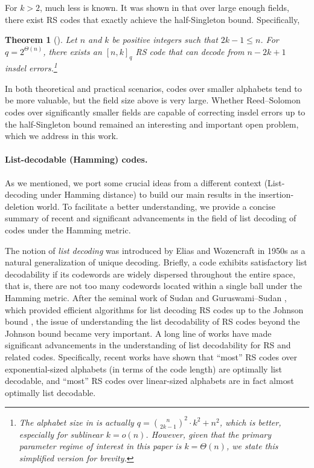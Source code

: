 \documentclass[11pt]{article}
\theoremstyle{plain}
\newtheorem{thm}{Theorem}
\theoremstyle{definition}
\theoremstyle{remark}
\begin{document}
For $k>2$, much less is known. It was shown in \cite{con2023reed} that over large enough fields, there exist RS codes that exactly achieve the half-Singleton bound. 
Specifically, 
\begin{thm}[{\cite[Theorem 16]{con2023reed}}] \label{thm:con-rs-res}
    Let $n$ and $k$ be positive integers such that $2k - 1 \leq n$. For $q = 2^{\Theta(n)}$, there exists an $[n,k]_q$ RS code that can decode from $n-2k+1$ insdel errors.\footnote{The alphabet size in \cite[proof of Theorem 16]{con2023reed} is actually $q=\binom{n}{2k-1}^2 \cdot k^2 + n^2$, which is better, especially for sublinear $k=o(n)$.
    However, given that the primary parameter regime of interest in this paper is $k=\Theta(n)$, we state this simplified version for brevity.}
\end{thm}
In both theoretical and practical scenarios, codes over smaller alphabets tend to be more valuable, but the field size above is very large. Whether Reed--Solomon codes over significantly smaller fields are capable of correcting insdel errors up to the half-Singleton bound remained an interesting and important open problem, which we address in this work.

\paragraph{List-decodable (Hamming) codes.}
As we  mentioned, we port some crucial ideas from a different context (List-decoding under Hamming distance) to build our main results in the insertion-deletion world. 
To facilitate a better understanding, we provide a concise summary of recent and significant advancements in the field of list decoding of codes under the Hamming metric. 

The notion of \emph{list decoding} was introduced by Elias and Wozencraft \cite{elias1957list,wozencraft1958list}
in 1950s as a natural generalization of unique decoding. 
Briefly, a code exhibits satisfactory list decodability if its codewords are widely dispersed throughout the entire space, that is, there are not too many codewords located within a single ball under the Hamming metric. After the seminal work of Sudan \cite{sudan1997decoding} and Guruswami--Sudan \cite{guruswami1998improved}, which provided efficient algorithms for list decoding RS codes up to the Johnson bound \cite{johnson1962new}, the issue of understanding the list decodability of RS codes beyond the Johnson bound became very important. A long line 
of works \cite{rudra2014every, shangguan2020combinatorial, guo2022improved, ferber2022list, goldberg2022list,brakensiek2023generic,GZ23, alrabiah2023randomly, brakensiek2024ag, ron2024efficient, guo2024random} 
have made significant advancements in the understanding of list decodability for RS and related codes. Specifically, recent works \cite{brakensiek2023generic, GZ23, alrabiah2023randomly} have shown that ``most'' RS codes over exponential-sized alphabets (in terms of the code length) are optimally list decodable, and ``most'' RS codes over linear-sized alphabets are in fact almost optimally list decodable.
\end{document}
